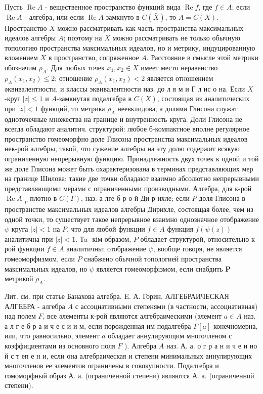\documentclass[10pt]{article}
\begin{document}
Пусть $\operatorname{Re} A$ - вещественное пространство функций вида $\operatorname{Re} f$, где $f \in A$; если $\operatorname{Re} A$ - алгебра, или если $\operatorname{Re} A$ замкнуто в $C(\bar{X})$, то $A=C(X)$. Пространство $X$ можно рассматривать как часть пространства максимальных идеалов алгебры $A$; поэтому на $X$ можно рассматривать не только обычную топологию пространства максимальных идеалов, но и метрику, индуцированную вложением $X$ в пространство, сопряженное $A$. Расстояние в смысле этой метрики обозначим $\rho_{A}$. Для любых точек $x_{1}, x_{2} \in X$ имеет место неравенство $\rho_{A}\left(x_{1}, x_{2}\right) \leqslant 2$; отношение $\rho_{A}\left(x_{1}, x_{2}\right)<2$ является отношением әквивалентности, и классы эквивалентности наз. до л я м и Г л ис о на. Если $X$-круг $|z| \leqslant 1$ и $A$-замкнутая подалгебра в $C(X)$, состоящая из аналитических при $|z|<1$ функций, то метрика $\rho_{A}$ неевклидова, а долями Глисона служат одноточечные множества на границе и внутренность круга. Доли Глисона не всегда обладают аналитич. структурой: любое б-компактное вполне регулярное пространство гомеоморфно доле Глисона пространства максимальных идеалов нек-рой алгебры, такой, что сужение алгебры на эту долю содержит всякую ограниченную непрерывную функцию. Принадлежность двух точек к одной и той же доле Глисона может быть охарактеризована в терминах представляющих мер на границе Шилова: такие две точки обладают взаимно абсолютно непрерывными представляющими мерами с ограниченными производными. Алгебра, для к-рой $\left.\operatorname{Re} A\right|_{\Gamma}$ плотно в $C(\Gamma)$, наз. а лге б р о й Ди р ихле; если $P$-доля Глисона в пространстве максимальных идеалов алгебры Дирихле, состоящая более, чем из одной точки, то существует такое непрерывное взаимно однозначное отображение $\psi$ круга $|z|<1$ на $P$, что для любой функции $f \in A$ функция $f(\psi(z))$ аналитична при $|z|<1$. Тa- кім образом, $P$ обладает структурой, относительно к-рой функции $f \in A$ аналитичны; отображение $\psi$, вообще говоря, не является гомеоморфизмом, если $P$ снабжено обычной топологией пространства максимальных идеалов, но $\psi$ является гомеоморфізмом, если снабдить $\boldsymbol{P}$ метрикой $\rho_{A}$.



Лит. см. при статье Банахова алгебра. E. А. Горин. АЛГЕБРАИЧЕСКАЯ АЛГЕБРА - алгебра $A$ с ассоциативными степенями (в частности, ассоциативная) над полем $F$, все әлементы к-рой являются алгебраическими (элемент $a \in A$ наз. а л г е б р а и ч е с и и м, если порожденная им подалгебра $F[a]$ конечномерна, или, что равносильно, элемент $a$ обладает аннулирующим многочленом с коэффициентами из основного поля $F$ ). Алгебра $A$ наз. А. а. о г р а н и ч е н но й с т еп е н и, если она алгебраическая и степени минимальных аннулирующих многочленов ее элементов ограничены в совокупности. Подалгебра и гомоморфный образ А. а. (ограниченной степени) являются А. а. (ограниченной степени).
\end{document}
